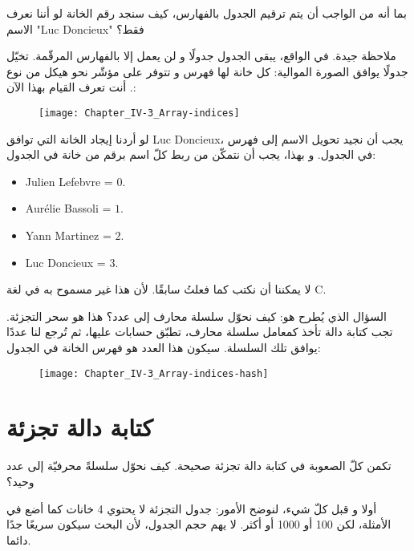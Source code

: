 \begin{question}
بما أنه من الواجب أن يتم ترقيم الجدول بالفهارس، كيف سنجد رقم الخانة لو أننا نعرف الاسم
"\textenglish{Luc Doncieux}"
 فقط؟
\end{question}

ملاحظة جيدة. في الواقع، يبقى الجدول جدولًا و لن يعمل إلا بالفهارس المرقّمة. تخيّل جدولًا يوافق الصورة الموالية: كل خانة لها فهرس و تتوفر على مؤشّر نحو هيكل من نوع
.
أنت تعرف القيام بهذا الآن:

\begin{figure}[H]
	\centering
	\texttt{[image: Chapter\_IV-3\_Array-indices]}
\end{figure}

 لو أردنا إيجاد الخانة التي توافق
\textenglish{Luc Doncieux}،
 يجب أن نجيد تحويل الاسم إلى فهرس في الجدول. و بهذا، يجب أن نتمكّن من ربط كلّ اسم برقم من خانة في الجدول:

\begin{itemize}
	\item \textenglish{Julien Lefebvre} = $0$.
	\item \textenglish{Aurélie Bassoli} = $1$.
	\item \textenglish{Yann Martinez} = $2$.
	\item \textenglish{Luc Doncieux} = $3$.
\end{itemize}

لا يمكننا أن نكتب
كما فعلتُ سابقًا. لأن هذا غير مسموح به في لغة \textenglish{C}.

السؤال الذي يُطرح هو: كيف نحوّل سلسلة محارف إلى عدد؟ هذا هو سحر التجزئة. تجب كتابة دالة تأخذ كمعامل سلسلة محارف، تطبّق حسابات عليها، ثم تُرجع لنا عددًا يوافق تلك السلسلة. سيكون هذا العدد هو فهرس الخانة في الجدول:

\begin{figure}[H]
	\centering
	\texttt{[image: Chapter\_IV-3\_Array-indices-hash]}
\end{figure}

\section{كتابة دالة تجزئة}

تكمن كلّ الصعوبة في كتابة دالة تجزئة صحيحة. كيف نحوّل سلسلةً محرفيّة إلى عدد وحيد؟

أولا و قبل كلّ شيء، لنوضح الأمور: جدول التجزئة لا يحتوي 4 خانات كما أضع في الأمثلة، لكن 100 أو 1000 أو أكثر. لا يهم حجم الجدول، لأن البحث سيكون سريعًا جدًا دائما.

